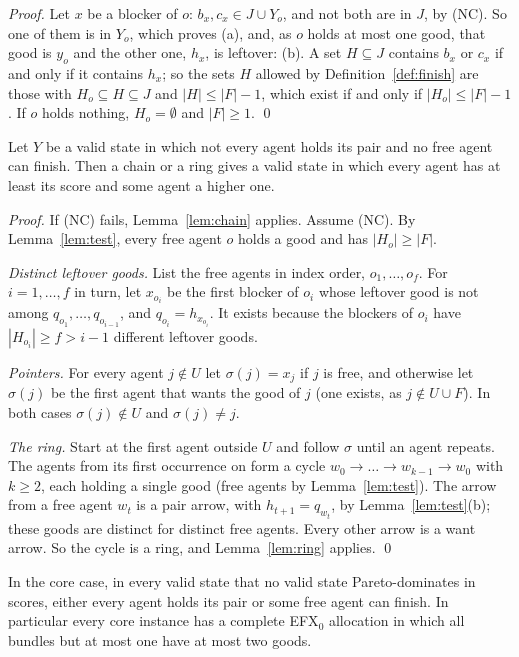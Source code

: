 \documentclass[runningheads,11pt]{llncs}
\newcommand{\efxz}{\texorpdfstring{\mbox{EFX$_0$}}{EFX0}}
\begin{document}
\begin{proof}
Let $x$ be a blocker of $o$: $b_x,c_x\in J\cup Y_o$, and not both are in $J$, by (NC). So one of them is in $Y_o$, which proves (a), and, as $o$ holds at most one good, that good is $y_o$ and the other one, $h_x$, is leftover: (b). A set $H\subseteq J$ contains $b_x$ or $c_x$ if and only if it contains $h_x$; so the sets $H$ allowed by Definition~\ref{def:finish} are those with $H_o\subseteq H\subseteq J$ and $|H|\le|F|-1$, which exist if and only if $|H_o|\le|F|-1$. If $o$ holds nothing, $H_o=\emptyset$ and $|F|\ge1$. \qed
\end{proof}

\begin{theorem}\label{thm:improve}
Let $Y$ be a valid state in which not every agent holds its pair and no free agent can finish. Then a chain or a ring gives a valid state in which every agent has at least its score and some agent a higher one.
\end{theorem}

\begin{proof}
If (NC) fails, Lemma~\ref{lem:chain} applies. Assume (NC). By Lemma~\ref{lem:test}, every free agent $o$ holds a good and has $|H_o|\ge|F|$.

\emph{Distinct leftover goods.} List the free agents in index order, $o_1,\dots,o_f$. For $i=1,\dots,f$ in turn, let $x_{o_i}$ be the first blocker of $o_i$ whose leftover good is not among $q_{o_1},\dots,q_{o_{i-1}}$, and $q_{o_i}=h_{x_{o_i}}$. It exists because the blockers of $o_i$ have $|H_{o_i}|\ge f>i-1$ different leftover goods.

\emph{Pointers.} For every agent $j\notin U$ let $\sigma(j)=x_j$ if $j$ is free, and otherwise let $\sigma(j)$ be the first agent that wants the good of $j$ (one exists, as $j\notin U\cup F$). In both cases $\sigma(j)\notin U$ and $\sigma(j)\ne j$.

\emph{The ring.} Start at the first agent outside $U$ and follow $\sigma$ until an agent repeats. The agents from its first occurrence on form a cycle $w_0\to\dots\to w_{k-1}\to w_0$ with $k\ge2$, each holding a single good (free agents by Lemma~\ref{lem:test}). The arrow from a free agent $w_t$ is a pair arrow, with $h_{t+1}=q_{w_t}$, by Lemma~\ref{lem:test}(b); these goods are distinct for distinct free agents. Every other arrow is a want arrow. So the cycle is a ring, and Lemma~\ref{lem:ring} applies. \qed
\end{proof}

\begin{corollary}\label{cor:po}
In the core case, in every valid state that no valid state Pareto-dominates in scores, either every agent holds its pair or some free agent can finish. In particular every core instance has a complete \efxz{} allocation in which all bundles but at most one have at most two goods.
\end{corollary}
\end{document}
